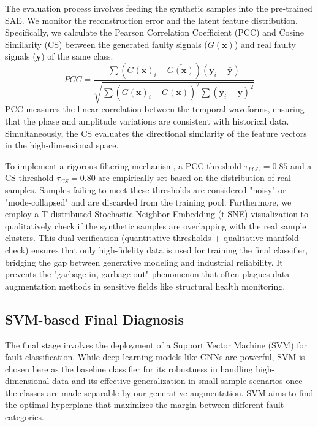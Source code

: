 The evaluation process involves feeding the synthetic samples into the pre-trained SAE. We monitor the reconstruction error and the latent feature distribution. Specifically, we calculate the Pearson Correlation Coefficient (PCC) and Cosine Similarity (CS) between the generated faulty signals ($G(\boldsymbol{x})$) and real faulty signals ($\boldsymbol{y}$) of the same class. 
\begin{equation}
PCC = \frac{\sum (G(\boldsymbol{x})_i - \bar{G(\boldsymbol{x})})(\boldsymbol{y}_i - \bar{\boldsymbol{y}})}{\sqrt{\sum (G(\boldsymbol{x})_i - \bar{G(\boldsymbol{x})})^2 \sum (\boldsymbol{y}_i - \bar{\boldsymbol{y}})^2}}
\end{equation}
PCC measures the linear correlation between the temporal waveforms, ensuring that the phase and amplitude variations are consistent with historical data. Simultaneously, the CS evaluates the directional similarity of the feature vectors in the high-dimensional space.

To implement a rigorous filtering mechanism, a PCC threshold $\tau_{PCC} = 0.85$ and a CS threshold $\tau_{CS} = 0.80$ are empirically set based on the distribution of real samples. Samples failing to meet these thresholds are considered "noisy" or "mode-collapsed" and are discarded from the training pool. Furthermore, we employ a T-distributed Stochastic Neighbor Embedding (t-SNE) visualization to qualitatively check if the synthetic samples are overlapping with the real sample clusters. This dual-verification (quantitative thresholds + qualitative manifold check) ensures that only high-fidelity data is used for training the final classifier, bridging the gap between generative modeling and industrial reliability. It prevents the "garbage in, garbage out" phenomenon that often plagues data augmentation methods in sensitive fields like structural health monitoring.

\subsection{SVM-based Final Diagnosis}
The final stage involves the deployment of a Support Vector Machine (SVM) for fault classification. While deep learning models like CNNs are powerful, SVM is chosen here as the baseline classifier for its robustness in handling high-dimensional data and its effective generalization in small-sample scenarios once the classes are made separable by our generative augmentation. SVM aims to find the optimal hyperplane that maximizes the margin between different fault categories.


